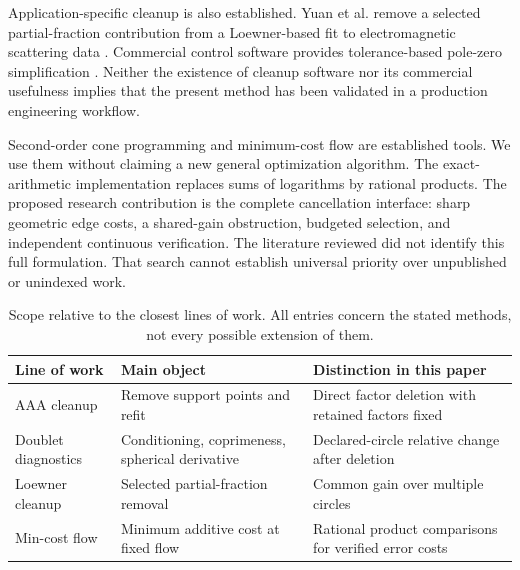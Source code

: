 \documentclass[11pt]{article}
\theoremstyle{definition}\newtheorem{definition}[theorem]{Definition}
\begin{document}
Application-specific cleanup is also established. Yuan et al. remove a selected partial-fraction contribution from a Loewner-based fit to electromagnetic scattering data \cite{yuan}. Commercial control software provides tolerance-based pole-zero simplification \cite{minreal}. Neither the existence of cleanup software nor its commercial usefulness implies that the present method has been validated in a production engineering workflow.

Second-order cone programming \cite{boyd} and minimum-cost flow \cite{flows} are established tools. We use them without claiming a new general optimization algorithm. The exact-arithmetic implementation replaces sums of logarithms by rational products. The proposed research contribution is the complete cancellation interface: sharp geometric edge costs, a shared-gain obstruction, budgeted selection, and independent continuous verification. The literature reviewed did not identify this full formulation. That search cannot establish universal priority over unpublished or unindexed work.

\begin{table}[t]\centering\small
\caption{Scope relative to the closest lines of work. All entries concern the stated methods, not every possible extension of them.}
\begin{tabular}{p{.24\linewidth}p{.34\linewidth}p{.33\linewidth}}\toprule
Line of work & Main object & Distinction in this paper\\\midrule
AAA cleanup \cite{aaa,scipydoc} & Remove support points and refit & Direct factor deletion with retained factors fixed\\
Doublet diagnostics \cite{beckermann} & Conditioning, coprimeness, spherical derivative & Declared-circle relative change after deletion\\
Loewner cleanup \cite{yuan} & Selected partial-fraction removal & Common gain over multiple circles\\
Min-cost flow \cite{flows} & Minimum additive cost at fixed flow & Rational product comparisons for verified error costs\\\bottomrule
\end{tabular}\label{tab:prior}
\end{table}
\end{document}
